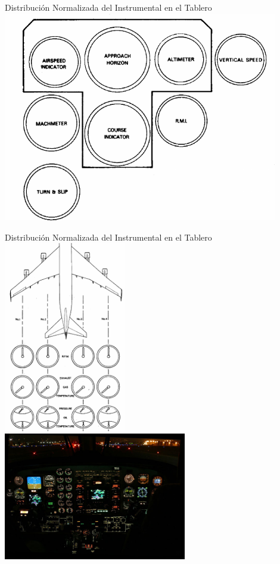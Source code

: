 \begin{frame}{Distribuci\'on Normalizada del Instrumental en el
 Tablero}
\includegraphics[width=0.9\textwidth]{imagenes/1.3.distribucion.normalizada.instrumental.en.tablero/6.png}

\end{frame}

\begin{frame}{Distribuci\'on Normalizada del Instrumental en el
 Tablero}
\includegraphics[width=0.4\textwidth]{imagenes/1.3.distribucion.normalizada.instrumental.en.tablero/instrumentos_motor.png}
\includegraphics[width=0.6\textwidth]{imagenes/1.3.distribucion.normalizada.instrumental.en.tablero/iluminacion.jpg}

\end{frame}



